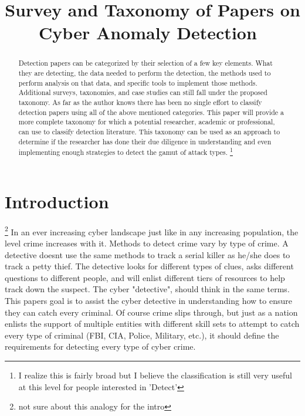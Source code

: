 \documentclass[conference]{IEEEtran}
\begin{document}
\title{Survey and Taxonomy of Papers on Cyber Anomaly Detection\
}

\author{
}

\maketitle

\begin{abstract}
Detection papers can be categorized by their selection of a few key elements. What they are detecting, the data needed to perform the detection, the methods used to perform analysis on that data, and specific tools to implement those methods. Additional surveys, taxonomies, and case studies can still fall under the proposed taxonomy. As far as the author knows there has been no single effort to classify detection papers using all of the above mentioned categories. This paper will provide a more complete taxonomy for which a potential researcher, academic or professional, can use to classify detection literature. This taxonomy can be used as an approach to determine if the researcher has done their due diligence in understanding and even implementing enough strategies to detect the gamut of attack types. 
\footnote{I realize this is fairly broad but I believe the classification is still very useful at this level for people interested in 'Detect'}
\end{abstract}

\section{Introduction}
\footnote{not sure about this analogy for the intro}
In an ever increasing cyber landscape just like in any increasing population, the level crime increases with it. Methods to detect crime vary by type of crime. A detective doesnt use the same methods to track a serial killer as he/she does to track a petty thief. The detective looks for different types of clues, asks different questions to different people, and will enlist different tiers of resources to help track down the suspect. The cyber "detective", should think in the same terms. This papers goal is to assist the cyber detective in understanding how to ensure they can catch every criminal. Of course crime slips through, but just as a nation enlists the support of multiple entities with different skill sets to attempt to catch every type of criminal (FBI, CIA, Police, Military, etc.), it should define the requirements for detecting every type of cyber crime. 
\end{document}
